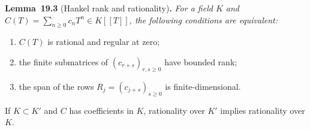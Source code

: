 \documentclass[11pt]{article}
\newenvironment{bpstatement}[2]{\par\addvspace{0.6\baselineskip}\noindent\textbf{#1}#2\textbf{.}\enspace\ignorespaces}
  {\par\addvspace{0.4\baselineskip}}
\newenvironment{bpstatementit}[2]{\begin{bpstatement}{#1}{#2}\itshape\ignorespaces}{\end{bpstatement}}
\begin{document}
\label{bp12}%
\begin{bpstatementit}{Lemma~19.3}{ (Hankel rank and rationality)}
For a field \(K\) and \(C(T)=\sum_{n\geq0}c_nT^n\in K[[T]]\), the following conditions are equivalent:

\begin{enumerate}
\item \(C(T)\) is rational and regular at zero;
\item the finite submatrices of \((c_{r+s})_{r,s\geq0}\) have bounded rank;
\item the span of the rows \(R_j=(c_{j+s})_{s\geq0}\) is finite-dimensional.
\end{enumerate}

If \(K\subset K'\) and \(C\) has coefficients in \(K\), rationality over \(K'\) implies rationality over \(K\).
\end{bpstatementit}
\end{document}
